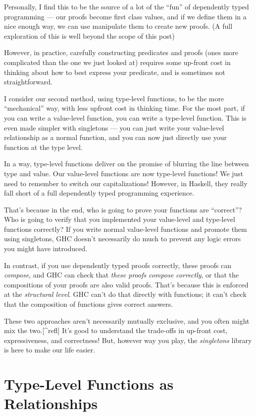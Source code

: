 \documentclass[]{article}
\begin{document}
Personally, I find this to be the source of a lot of the ``fun'' of dependently
typed programming --- our proofs become first class values, and if we define
them in a nice enough way, we can use manipulate them to create new proofs. (A
full exploration of this is well beyond the scope of this post)

However, in practice, carefully constructing predicates and proofs (ones more
complicated than the one we just looked at) requires some up-front cost in
thinking about how to best express your predicate, and is sometimes not
straightforward.

I consider our second method, using type-level functions, to be the more
``mechanical'' way, with less upfront cost in thinking time. For the most part,
if you can write a value-level function, you can write a type-level function.
This is even made simpler with singletons --- you can just write your
value-level relationship as a normal function, and you can now just directly use
your function at the type level.

In a way, type-level functions deliver on the promise of blurring the line
between type and value. Our value-level functions are now type-level functions!
We just need to remember to switch our capitalizations! However, in Haskell,
they really fall short of a full dependently typed programming experience.

That's because in the end, who is going to prove your functions are ``correct''?
Who is going to verify that you implemented your value-level and type-level
functions correctly? If you write normal value-level functions and promote them
using singletons, GHC doesn't necessarily do much to prevent any logic errors
you might have introduced.

In contrast, if you use dependently typed proofs correctly, these proofs can
\emph{compose}, and GHC can check that \emph{these proofs compose correctly}, or
that the compositions of your proofs are also valid proofs. That's because this
is enforced at the \emph{structural level}. GHC can't do that directly with
functions; it can't check that the composition of functions gives correct
answers.

These two approaches aren't necessarily mutually exclusive, and you often might
mix the two.{[}\^{}refl{]} It's good to understand the trade-offs in up-front
cost, expressiveness, and correctness! But, however way you play, the
\emph{singletons} library is here to make our life easier.

\hypertarget{type-level-functions-as-relationships}{%
\section{Type-Level Functions as
Relationships}\label{type-level-functions-as-relationships}}
\end{document}
